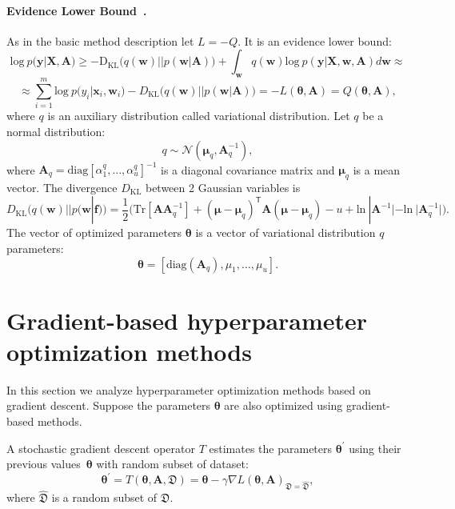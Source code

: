 \documentclass[smallcondensed]{svjour3}
\begin{document}
\paragraph{Evidence Lower Bound~\cite{nips}.}
As in the basic method description let $L=-Q$. It is an evidence lower bound:
\begin{equation} 
\label{eq:elbo}
\text{log}~p(\mathbf{y}|\mathbf{X},\mathbf{A})  
\geq 
-\text{D}_\text{KL} \bigl(q(\mathbf{w})||p(\mathbf{w}|\mathbf{A})\bigr) + \int_{\mathbf{w}} q(\mathbf{w})\text{log}~{p(\mathbf{y}|\mathbf{X},\mathbf{w},\mathbf{A})} d \mathbf{w}  \approx
\end{equation}
\[
\approx \sum_{i=1}^m \text{log}~p({y}_i|\mathbf{x}_i, \mathbf{w}_i) - D_\text{KL}\bigl(q (\mathbf{w}) || p (\mathbf{w}|\mathbf{A})\bigr) = -L(\boldsymbol{\theta}, \mathbf{A}) = Q(\boldsymbol{\theta}, \mathbf{A}),
\]
where $q$ is an auxiliary distribution called variational distribution. Let $q$ be a normal distribution:
\begin{equation}
\label{eq:diag}
	q \sim \mathcal{N}(\boldsymbol{\mu}_q, \mathbf{A}^{-1}_q),
\end{equation}
where $\mathbf{A}_q = \text{diag}[\alpha^q_1, \dots, \alpha^q_u]^{-1}$ is  a diagonal covariance matrix and $\boldsymbol{\mu}_q$ is a mean vector.
The divergence $D_\text{KL}$ between 2 Gaussian variables is 
\[
	D_\text{KL}\bigl(q (\mathbf{w}) || p (\mathbf{w}|\mathbf{f})\bigr) = \frac{1}{2} \bigl( \text{Tr} [\mathbf{A}\mathbf{A}^{-1}_q] + (\boldsymbol{\mu} - \boldsymbol{\mu}_q)^\mathsf{T}\mathbf{A}(\boldsymbol{\mu} - \boldsymbol{\mu}_q) - u +\text{ln}~|\mathbf{A}^{-1}| - \text{ln}~|\mathbf{A}_q^{-1}| \bigr).
\]
The vector of optimized parameters $\boldsymbol{\theta}$ is a vector of variational distribution $q$ parameters:
\[
\boldsymbol{\theta} = [\text{diag}(\mathbf{A}_q), {\mu}_1,\dots,{\mu}_u].
\]




\section{Gradient-based hyperparameter optimization methods}
\label{gbhom}
In this section we analyze hyperparameter optimization methods based on gradient descent. Suppose the parameters $\boldsymbol{\theta}$ are also optimized using gradient-based methods. 

\begin{definition}
A stochastic gradient descent operator $T$ estimates the parameters $\boldsymbol{\theta}^\prime$ using their previous values~$\boldsymbol{\theta}$ with random subset of dataset:
\[
	\boldsymbol{\theta}^\prime = T(\boldsymbol{\theta}, \mathbf{A}, \mathfrak{D}) = \boldsymbol{\theta} - \gamma \nabla L(\boldsymbol{\theta}, \mathbf{A})_{\mathfrak{D} = \hat{\mathfrak{D}}},
\]
where $\hat{\mathfrak{D}}$ is a random subset of $\mathfrak{D}$.
\end{definition}
\end{document}
